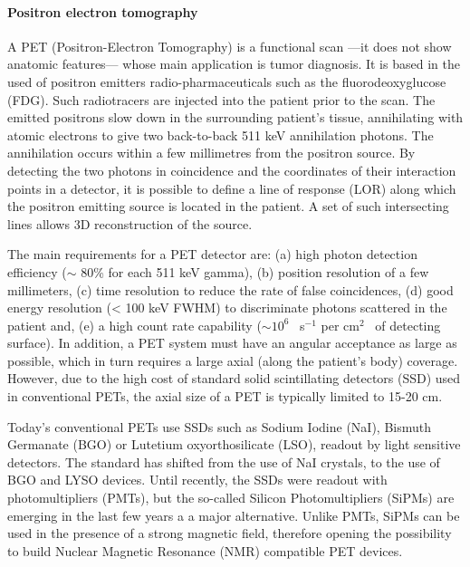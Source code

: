 \paragraph{Positron electron tomography}

A PET (Positron-Electron Tomography) is a functional scan ---it does not show anatomic features--- whose main application is tumor diagnosis. It is based in the used of positron emitters radio-pharmaceuticals such as the fluorodeoxyglucose (FDG). Such radiotracers 
are injected into the patient prior to the scan. The emitted positrons slow down in the surrounding patient’s tissue, annihilating with atomic electrons to give two back-to-back 511 keV annihilation photons. The annihilation occurs within a few millimetres from the positron source. By detecting the two photons in coincidence and the coordinates of their interaction points in a detector, it is possible to define a line of response (LOR) along which the positron emitting source is located in the patient. A set of such intersecting lines allows 3D reconstruction of the source. 

The main requirements for a PET detector are: (a) high photon detection efficiency ($\sim$ 80\% for each 511 keV gamma), (b) position resolution of a few millimeters, (c) time resolution to reduce the rate of false coincidences, (d) good energy resolution (< 100 keV FWHM) to discriminate photons scattered in the patient and, (e) a high count rate capability ($\sim10^6$~ s$^{-1}$ per cm$^2$~ of detecting surface). In addition, a PET system must have an angular acceptance as large as possible, which in turn requires a large axial (along the patient's body) coverage. However, due to the high cost of standard solid scintillating detectors (SSD) used in conventional PETs, the axial size  of a PET is typically limited to 15-20 cm. 

Today's conventional PETs use SSDs such as Sodium Iodine (NaI), Bismuth Germanate (BGO) or Lutetium oxyorthosilicate (LSO), readout by light sensitive detectors. The standard has shifted from the use of NaI crystals, to the use of BGO and LYSO devices. Until recently, the SSDs were readout with photomultipliers (PMTs), but the so-called Silicon Photomultipliers (SiPMs) are emerging in the last few years a a major alternative. Unlike PMTs, SiPMs can be used in the presence of a strong magnetic field, therefore opening the possibility to build Nuclear Magnetic Resonance (NMR) compatible PET devices. 

